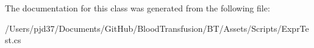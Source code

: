 The documentation for this class was generated from the following file\+:\begin{DoxyCompactItemize}
\item 
/\+Users/pjd37/\+Documents/\+Git\+Hub/\+Blood\+Transfusion/\+B\+T/\+Assets/\+Scripts/Expr\+Test.\+cs\end{DoxyCompactItemize}
